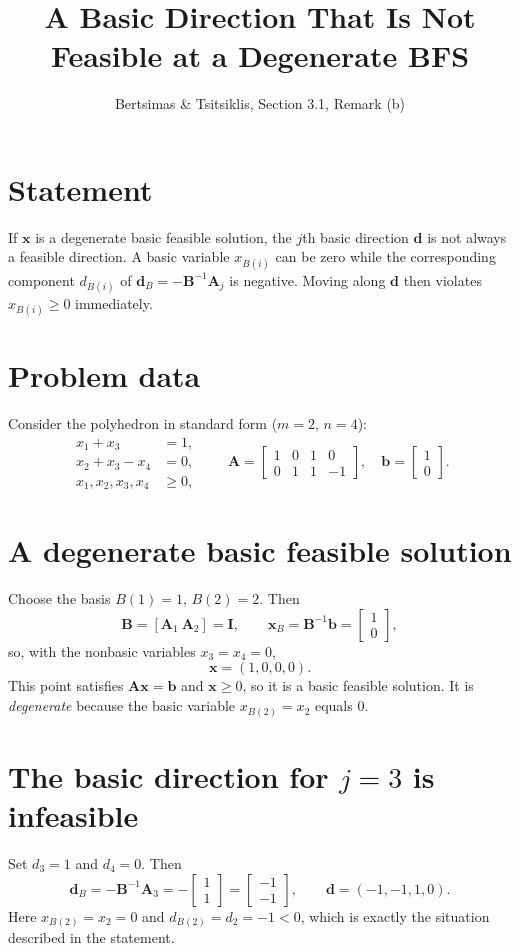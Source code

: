 \documentclass[11pt]{article}
\title{A Basic Direction That Is Not Feasible at a Degenerate BFS}
\author{Bertsimas \& Tsitsiklis, Section 3.1, Remark (b)}
\date{}
\newcommand{\A}{\mathbf{A}}
\newcommand{\B}{\mathbf{B}}
\newcommand{\x}{\mathbf{x}}
\newcommand{\dd}{\mathbf{d}}
\newcommand{\bb}{\mathbf{b}}
\newcommand{\I}{\mathbf{I}}
\theoremstyle{definition}
\begin{document}
\maketitle

\section*{Statement}
If $\x$ is a degenerate basic feasible solution, the $j$th basic direction $\dd$ is not always a feasible direction. A basic variable $x_{B(i)}$ can be zero while the corresponding component $d_{B(i)}$ of $\dd_B=-\B^{-1}\A_j$ is negative. Moving along $\dd$ then violates $x_{B(i)}\ge 0$ immediately.

\section*{Problem data}
Consider the polyhedron in standard form ($m=2$, $n=4$):
\[
\begin{aligned}
x_1 + x_3 &= 1,\\
x_2 + x_3 - x_4 &= 0,\\
x_1,x_2,x_3,x_4 &\ge 0,
\end{aligned}
\qquad
\A=\begin{bmatrix}1&0&1&0\\[2pt]0&1&1&-1\end{bmatrix},\quad
\bb=\begin{bmatrix}1\\[2pt]0\end{bmatrix}.
\]

\section*{A degenerate basic feasible solution}
Choose the basis $B(1)=1$, $B(2)=2$. Then
\[
\B=[\A_1\ \A_2]=\I,\qquad
\x_B=\B^{-1}\bb=\begin{bmatrix}1\\0\end{bmatrix},
\]
so, with the nonbasic variables $x_3=x_4=0$,
\[
\x=(1,0,0,0).
\]
This point satisfies $\A\x=\bb$ and $\x\ge 0$, so it is a basic feasible solution. It is \emph{degenerate} because the basic variable $x_{B(2)}=x_2$ equals $0$.

\section*{The basic direction for $j=3$ is infeasible}
Set $d_3=1$ and $d_4=0$. Then
\[
\dd_B=-\B^{-1}\A_3=-\begin{bmatrix}1\\1\end{bmatrix}=\begin{bmatrix}-1\\-1\end{bmatrix},
\qquad
\dd=(-1,-1,1,0).
\]
Here $x_{B(2)}=x_2=0$ and $d_{B(2)}=d_2=-1<0$, which is exactly the situation described in the statement.
\end{document}
